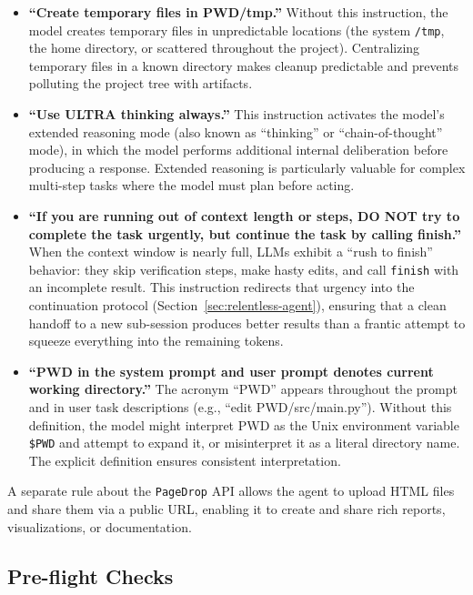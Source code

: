 \documentclass{article}
\begin{document}
\begin{itemize}[nosep]
\item \textbf{``Create temporary files in PWD/tmp.''}  Without this
  instruction, the model creates temporary files in unpredictable
  locations (the system \texttt{/tmp}, the home directory, or
  scattered throughout the project).  Centralizing temporary files in
  a known directory makes cleanup predictable and prevents polluting
  the project tree with artifacts.

\item \textbf{``Use ULTRA thinking always.''}  This instruction
  activates the model's extended reasoning mode (also known as
  ``thinking'' or ``chain-of-thought'' mode), in which the model
  performs additional internal deliberation before producing a
  response.  Extended reasoning is particularly valuable for complex
  multi-step tasks where the model must plan before acting.

\item \textbf{``If you are running out of context length or steps, DO
  NOT try to complete the task urgently, but continue the task by
  calling finish.''}  When the context window is nearly full, LLMs
  exhibit a ``rush to finish'' behavior: they skip verification
  steps, make hasty edits, and call \texttt{finish} with an
  incomplete result.  This instruction redirects that urgency into
  the continuation protocol (Section~\ref{sec:relentless-agent}),
  ensuring that a clean handoff to a new sub-session produces better
  results than a frantic attempt to squeeze everything into the
  remaining tokens.

\item \textbf{``PWD in the system prompt and user prompt denotes
  current working directory.''}  The acronym ``PWD'' appears
  throughout the prompt and in user task descriptions (e.g.,
  ``edit PWD/src/main.py'').  Without this definition, the model
  might interpret PWD as the Unix environment variable
  \texttt{\$PWD} and attempt to expand it, or misinterpret it as a
  literal directory name.  The explicit definition ensures consistent
  interpretation.
\end{itemize}

\noindent A separate rule about the \texttt{PageDrop} API allows the
agent to upload HTML files and share them via a public URL, enabling it
to create and share rich reports, visualizations, or documentation.

\subsection{Pre-flight Checks}
\end{document}

